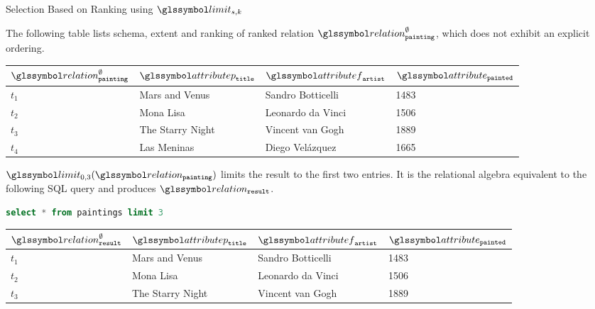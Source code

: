 \begin{example}[label=example:sk_selection]{Selection Based on Ranking using $\limit_{s,k}$}{}

    The following table lists schema, extent and ranking of ranked relation $\relation^{\emptyset}_{\mathtt{painting}}$, which does not exhibit an explicit ordering.

    \begin{center}
        \begin{tabular}{ l || l | l | l |}
            $\relation^{\emptyset}_{\mathtt{painting}}$ & $\attributep_{\mathtt{title}}$  & $\attributef_{\mathtt{artist}}$ & $\attribute_{\mathtt{painted}}$ \\ 
            \hline
            \hline
            $t_1$ & Mars and Venus & Sandro Botticelli & 1483 \\
            \hline
            $t_2$ & Mona Lisa &  Leonardo da Vinci & 1506 \\
            \hline
            $t_3$ & The Starry Night & Vincent van Gogh & 1889 \\
            \hline
            $t_4$ & Las Meninas & Diego Velázquez & 1665 \\
            \hline
        \end{tabular}
    \end{center}

    $\limit_{0,3}(\relation_{\mathtt{painting}})$ limits the result to the first two entries. It is the relational algebra equivalent to the following SQL query and produces $\relation_{\mathtt{result}}$.

    \begin{lstlisting}[language=SQL, showspaces=false, basicstyle=\ttfamily, numbers=none]
        select * from paintings limit 3
    \end{lstlisting}

    \begin{center}
        \begin{tabular}{ l || l | l | l |}
            $\relation^{\emptyset}_{\mathtt{result}}$ & $\attributep_{\mathtt{title}}$  & $\attributef_{\mathtt{artist}}$ & $\attribute_{\mathtt{painted}}$ \\ 
            \hline
            \hline
            $t_1$ & Mars and Venus & Sandro Botticelli & 1483 \\
            \hline
            $t_2$ & Mona Lisa &  Leonardo da Vinci & 1506 \\
            \hline
            $t_3$ & The Starry Night & Vincent van Gogh & 1889 \\
            \hline
        \end{tabular}
    \end{center}
\end{example}

